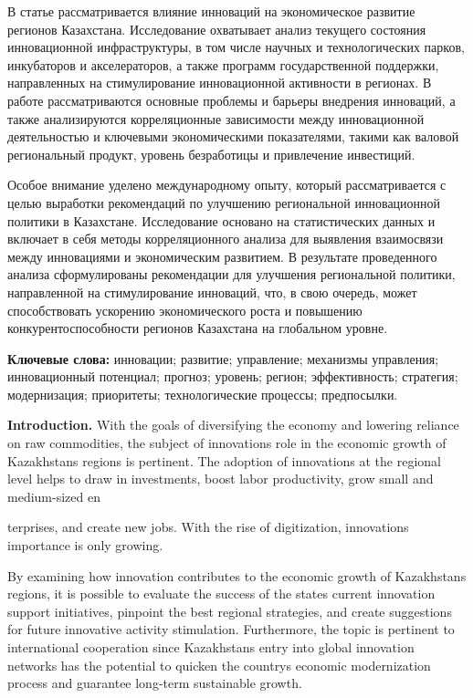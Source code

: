 В статье рассматривается влияние инноваций на экономическое развитие
регионов Казахстана. Исследование охватывает анализ текущего состояния
инновационной инфраструктуры, в том числе научных и технологических
парков, инкубаторов и акселераторов, а также программ государственной
поддержки, направленных на стимулирование инновационной активности в
регионах. В работе рассматриваются основные проблемы и барьеры внедрения
инноваций, а также анализируются корреляционные зависимости между
инновационной деятельностью и ключевыми экономическими показателями,
такими как валовой региональный продукт, уровень безработицы и
привлечение инвестиций.

Особое внимание уделено международному опыту, который рассматривается с
целью выработки рекомендаций по улучшению региональной инновационной
политики в Казахстане. Исследование основано на статистических данных и
включает в себя методы корреляционного анализа для выявления взаимосвязи
между инновациями и экономическим развитием. В результате проведенного
анализа сформулированы рекомендации для улучшения региональной политики,
направленной на стимулирование инноваций, что, в свою очередь, может
способствовать ускорению экономического роста и повышению
конкурентоспособности регионов Казахстана на глобальном уровне.

{\bfseries Ключевые слова:} инновации; развитие; управление; механизмы
управления; инновационный потенциал; прогноз; уровень; регион;
эффективность; стратегия; модернизация; приоритеты; технологические
процессы; предпосылки.

{\bfseries Introduction.} With the goals of diversifying the economy and
lowering reliance on raw commodities, the subject of
innovations\textquotesingle{} role in the economic growth of
Kazakhstan\textquotesingle s regions is pertinent. The adoption of
innovations at the regional level helps to draw in investments, boost
labor productivity, grow small and medium-sized en

terprises, and create new jobs. With the rise of digitization,
innovation\textquotesingle s importance is only growing.

By examining how innovation contributes to the economic growth of
Kazakhstan\textquotesingle s regions, it is possible to evaluate the
success of the state\textquotesingle s current innovation support
initiatives, pinpoint the best regional strategies, and create
suggestions for future innovative activity stimulation. Furthermore, the
topic is pertinent to international cooperation since
Kazakhstan\textquotesingle s entry into global innovation networks has
the potential to quicken the country\textquotesingle s economic
modernization process and guarantee long-term sustainable growth.

